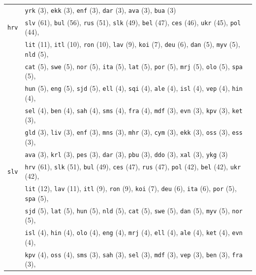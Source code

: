 \begin{center}
\begin{longtable}{ll}
 & \texttt{yrk} (3), \texttt{ekk} (3), \texttt{enf} (3), \texttt{dar} (3), \texttt{ava} (3), \texttt{bua} (3) \\
\texttt{hrv} & \texttt{slv} (61), \texttt{bul} (56), \texttt{rus} (51), \texttt{slk} (49), \texttt{bel} (47), \texttt{ces} (46), \texttt{ukr} (45), \texttt{pol} (44),\\
 & \texttt{lit} (11), \texttt{itl} (10), \texttt{ron} (10), \texttt{lav} (9), \texttt{koi} (7), \texttt{deu} (6), \texttt{dan} (5), \texttt{myv} (5), \texttt{nld} (5),\\
 & \texttt{cat} (5), \texttt{swe} (5), \texttt{nor} (5), \texttt{ita} (5), \texttt{lat} (5), \texttt{por} (5), \texttt{mrj} (5), \texttt{olo} (5), \texttt{spa} (5),\\
 & \texttt{hun} (5), \texttt{eng} (5), \texttt{sjd} (5), \texttt{ell} (4), \texttt{sqi} (4), \texttt{ale} (4), \texttt{isl} (4), \texttt{vep} (4), \texttt{hin} (4),\\
 & \texttt{sel} (4), \texttt{ben} (4), \texttt{sah} (4), \texttt{sms} (4), \texttt{fra} (4), \texttt{mdf} (3), \texttt{evn} (3), \texttt{kpv} (3), \texttt{ket} (3),\\
 & \texttt{gld} (3), \texttt{liv} (3), \texttt{enf} (3), \texttt{mns} (3), \texttt{mhr} (3), \texttt{cym} (3), \texttt{ekk} (3), \texttt{oss} (3), \texttt{ess} (3),\\
 & \texttt{ava} (3), \texttt{krl} (3), \texttt{pes} (3), \texttt{dar} (3), \texttt{pbu} (3), \texttt{ddo} (3), \texttt{xal} (3), \texttt{ykg} (3) \\
\texttt{slv} & \texttt{hrv} (61), \texttt{slk} (51), \texttt{bul} (49), \texttt{ces} (47), \texttt{rus} (47), \texttt{pol} (42), \texttt{bel} (42), \texttt{ukr} (42),\\
 & \texttt{lit} (12), \texttt{lav} (11), \texttt{itl} (9), \texttt{ron} (9), \texttt{koi} (7), \texttt{deu} (6), \texttt{ita} (6), \texttt{por} (5), \texttt{spa} (5),\\
 & \texttt{sjd} (5), \texttt{lat} (5), \texttt{hun} (5), \texttt{nld} (5), \texttt{cat} (5), \texttt{swe} (5), \texttt{dan} (5), \texttt{myv} (5), \texttt{nor} (5),\\
 & \texttt{isl} (4), \texttt{hin} (4), \texttt{olo} (4), \texttt{eng} (4), \texttt{mrj} (4), \texttt{ell} (4), \texttt{ale} (4), \texttt{ket} (4), \texttt{evn} (4),\\
 & \texttt{kpv} (4), \texttt{oss} (4), \texttt{sms} (3), \texttt{sah} (3), \texttt{sel} (3), \texttt{mdf} (3), \texttt{vep} (3), \texttt{ben} (3), \texttt{fra} (3),\\

\end{longtable}
\end{center}
